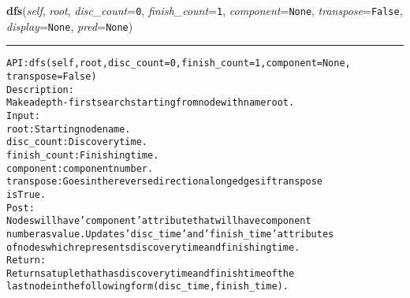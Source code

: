     \label{coinor:gimpy:graph:Graph:dfs}

    \vspace{0.5ex}

\hspace{.8\funcindent}\begin{boxedminipage}{\funcwidth}

    \raggedright \textbf{dfs}(\textit{self}, \textit{root}, \textit{disc\_count}={\tt 0}, \textit{finish\_count}={\tt 1}, \textit{component}={\tt None}, \textit{transpose}={\tt False}, \textit{display}={\tt None}, \textit{pred}={\tt None})

    \vspace{-1.5ex}

    \rule{\textwidth}{0.5\fboxrule}
\setlength{\parskip}{2ex}
\begin{alltt}

API: dfs(self, root, disc\_count = 0, finish\_count = 1, component=None,
    transpose=False)
Description:
Make a depth-first search starting from node with name root.
Input:
    root: Starting node name.
    disc\_count: Discovery time.
    finish\_count: Finishing time.
    component: component number.
    transpose: Goes in the reverse direction along edges if transpose
    is True.
Post:
    Nodes will have 'component' attribute that will have component
    number as value. Updates 'disc\_time' and 'finish\_time' attributes
    of nodes which represents discovery time and finishing time.
Return:
    Returns a tuple that has discovery time and finish time of the
    last node in the following form (disc\_time,finish\_time).
\end{alltt}

\setlength{\parskip}{1ex}
    \end{boxedminipage}

    \label{coinor:gimpy:graph:Graph:bfs}

    \vspace{0.5ex}

